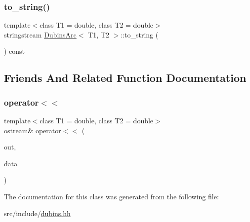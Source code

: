 \mbox{\label{class_dubins_arc_aa90c32f88f048e4e17ea79489f44dbfb}} 
\subsubsection{\texorpdfstring{to\_string()}{to\_string()}}
{\footnotesize\ttfamily template$<$class T1 = double, class T2 = double$>$ \\
stringstream \mbox{\hyperlink{class_dubins_arc}{Dubins\+Arc}}$<$ T1, T2 $>$\+::to\+\_\+string (\begin{DoxyParamCaption}{ }\end{DoxyParamCaption}) const\hspace{0.3cm}{\ttfamily [inline]}}



\subsection{Friends And Related Function Documentation}
\mbox{\label{class_dubins_arc_a9fbd2f7583b614eba51fd90a9def4b51}} 
\subsubsection{\texorpdfstring{operator$<$$<$}{operator<<}}
{\footnotesize\ttfamily template$<$class T1 = double, class T2 = double$>$ \\
ostream\& operator$<$$<$ (\begin{DoxyParamCaption}\item[{ostream \&}]{out,  }\item[{const \mbox{\hyperlink{class_dubins_arc}{Dubins\+Arc}}$<$ T1, T2 $>$ \&}]{data }\end{DoxyParamCaption})\hspace{0.3cm}{\ttfamily [friend]}}



The documentation for this class was generated from the following file\+:\begin{DoxyCompactItemize}
\item 
src/include/\mbox{\hyperlink{dubins_8hh}{dubins.\+hh}}\end{DoxyCompactItemize}
